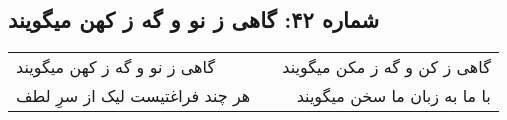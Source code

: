\begin{center}
\section*{شماره ۴۲: گاهی ز نو و گه ز  کهن میگویند}
\label{sec:042}
\begin{longtable}{l p{0.5cm} r}
گاهی ز نو و گه ز کهن میگویند
&&
گاهی ز کن و گه ز مکن میگویند
\\
هر چند فراغتیست لیک از سرِ لطف
&&
با ما به زبان ما سخن میگویند
\\
\end{longtable}
\end{center}
